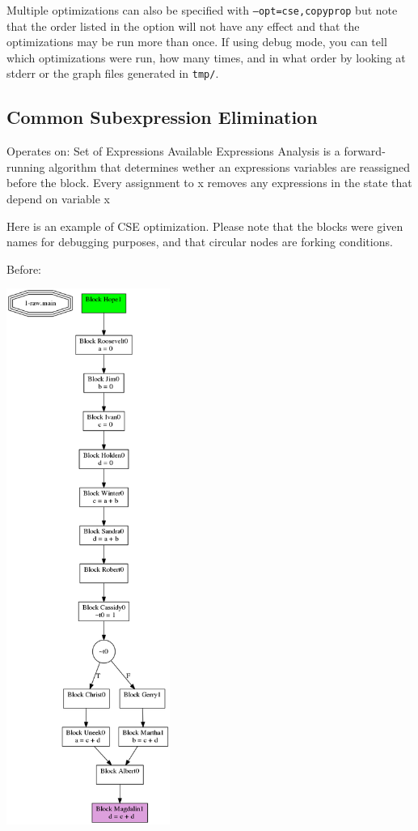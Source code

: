 \documentclass[11pt]{article}
\begin{document}
  Multiple optimizations can also be specified with \texttt{--opt=cse,copyprop} but note that the order listed in the option
  will not have any effect and that the optimizations may be run more than once. If using debug mode, you can tell
  which optimizations were run, how many times, and in what order by looking at stderr or the graph files generated
  in \texttt{tmp/}.

\subsection{Common Subexpression Elimination}
\label{sec-2.2}

    Operates on: Set of Expressions
    Available Expressions Analysis is a forward-running algorithm that determines wether an expressions variables are reassigned before the block. 
    Every assignment to x removes any expressions in the state that depend on variable x 
     
  Here is an example of CSE optimization. Please note that the blocks were given names for debugging 
  purposes, and that circular nodes are forking conditions.

  Before: 

  \includegraphics[width=0.4\textwidth]{./before_cse.png}
  
\end{document}
